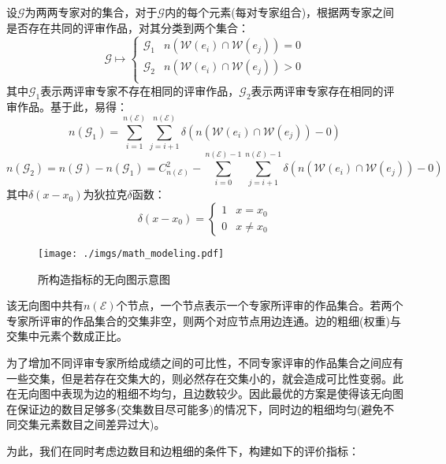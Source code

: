 \documentclass[12pt, onecolumn]{article}
\newcommand\normf{\fangsong}
\begin{document}
	设$\mathcal{G}$为两两专家对的集合，对于$\mathcal{G}$内的每个元素(每对专家组合)，根据两专家之间是否存在共同的评审作品，对其分类到两个集合：
	\begin{equation*}
	\mathcal{G}\mapsto\begin{cases}
	\mathcal{G}_1&n\left(\mathcal{W}(e_i)\cap\mathcal{W}(e_j) \right)=0\\
	\mathcal{G}_2&n\left(\mathcal{W}(e_i)\cap\mathcal{W}(e_j) \right)> 0\\
	\end{cases}
	\end{equation*}
	其中$\mathcal{G}_1$表示两评审专家不存在相同的评审作品，$\mathcal{G}_2$表示两评审专家存在相同的评审作品。基于此，易得：
	\begin{equation*}
	n(\mathcal{G}_1)=\sum_{i=1}^{n(\mathcal{E})}\sum_{j=i+1}^{n(\mathcal{E})}
	\delta(n\left(\mathcal{W}(e_i)\cap\mathcal{W}(e_j) \right)-0)
	\end{equation*}
	\begin{equation*}
	n(\mathcal{G}_2)=
	n(\mathcal{G})-n(\mathcal{G}_1)=
	C_{n(\mathcal{E})}^{2}-\sum_{i=0}^{n(\mathcal{E})-1}\sum_{j=i+1}^{n(\mathcal{E})-1}
	\delta(n\left(\mathcal{W}(e_i)\cap\mathcal{W}(e_j) \right)-0)
	\end{equation*}
	其中$\delta(x-x_0)$为狄拉克$\delta$函数：
	\begin{equation*}
	\delta(x-x_0)=\begin{cases}
	1&x=x_0\\0&x\ne x_0
	\end{cases}
	\end{equation*}
	
	
	\begin{figure}[t]
		\centering
		\texttt{[image: ./imgs/math\_modeling.pdf]}
		\caption{\normf 所构造指标的无向图示意图}
	\end{figure}
	该无向图中共有$n(\mathcal{E})$个节点，一个节点表示一个专家所评审的作品集合。若两个专家所评审的作品集合的交集非空，则两个对应节点用边连通。边的粗细(权重)与交集中元素个数成正比。
	
	为了增加不同评审专家所给成绩之间的可比性，不同专家评审的作品集合之间应有一些交集，但是若存在交集大的，则必然存在交集小的，就会造成可比性变弱。此在无向图中表现为边的粗细不均匀，且边数较少。因此最优的方案是使得该无向图在保证边的数目足够多(交集数目尽可能多)的情况下，同时边的粗细均匀(避免不同交集元素数目之间差异过大)。
	
	为此，我们在同时考虑边数目和边粗细的条件下，构建如下的评价指标：
	
\end{document}
